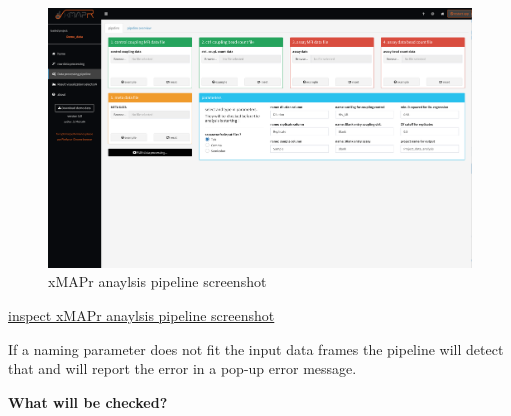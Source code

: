 \documentclass[]{book}
\theoremstyle{definition}
\theoremstyle{definition}
\theoremstyle{definition}
\theoremstyle{remark}
\begin{document}
\begin{figure}

{\centering \includegraphics[width=50.92in]{figures/pipeline} 

}

\caption{xMAPr anaylsis pipeline screenshot}\label{fig:xMAPrPipeline}
\end{figure}

\href{figures/pipeline.png}{inspect xMAPr anaylsis pipeline screenshot}

If a naming parameter does not fit the input data frames the pipeline
will detect that and will report the error in a pop-up error message.

\textbf{What will be checked?}
\end{document}
